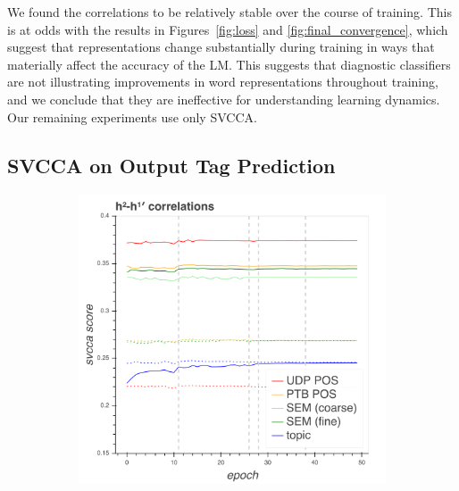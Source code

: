 We found the correlations to be relatively stable over the course of training. This is at odds with the results in Figures~\ref{fig:loss} and \ref{fig:final_convergence}, which suggest that representations change substantially during training in ways that materially affect the accuracy of the LM. This suggests that diagnostic classifiers are not illustrating improvements in word representations throughout training, and we conclude that they are ineffective for understanding learning dynamics. Our remaining experiments use only SVCCA.

\subsection{SVCCA on Output Tag Prediction}

\begin{figure}\centering
\begin{subfigure}{.48\textwidth}
\includegraphics[width=\textwidth]{svcca/lstm2-cca.png}

\end{subfigure}
\end{figure}
